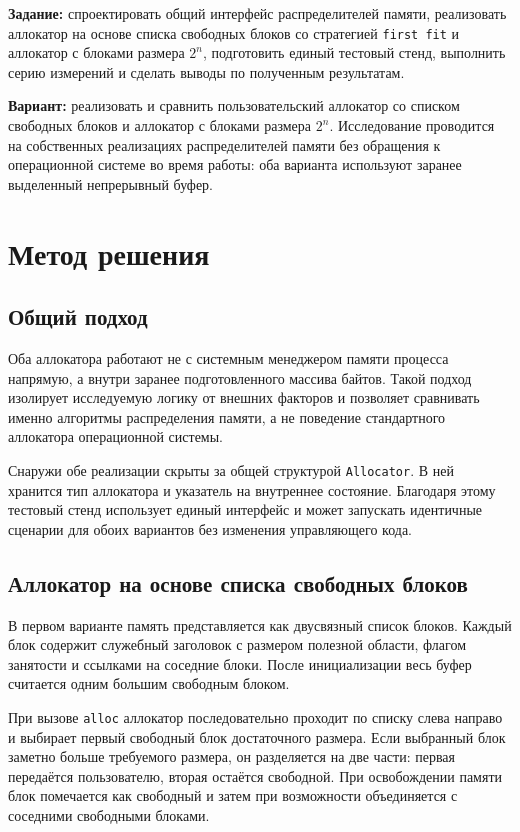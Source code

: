 \documentclass[unicode, 12pt, a4paper, oneside, fleqn]{article}
\begin{document}
\noindent\textbf{Задание:} спроектировать общий интерфейс распределителей памяти, реализовать аллокатор на основе списка свободных блоков со стратегией \texttt{first fit} и аллокатор с блоками размера $2^n$, подготовить единый тестовый стенд, выполнить серию измерений и сделать выводы по полученным результатам.

\noindent\textbf{Вариант:} реализовать и сравнить пользовательский аллокатор со списком свободных блоков и аллокатор с блоками размера $2^n$. Исследование проводится на собственных реализациях распределителей памяти без обращения к операционной системе во время работы: оба варианта используют заранее выделенный непрерывный буфер.

\section{Метод решения}

\subsection{Общий подход}

Оба аллокатора работают не с системным менеджером памяти процесса напрямую, а внутри заранее подготовленного массива байтов. Такой подход изолирует исследуемую логику от внешних факторов и позволяет сравнивать именно алгоритмы распределения памяти, а не поведение стандартного аллокатора операционной системы.

Снаружи обе реализации скрыты за общей структурой \texttt{Allocator}. В ней хранится тип аллокатора и указатель на внутреннее состояние. Благодаря этому тестовый стенд использует единый интерфейс и может запускать идентичные сценарии для обоих вариантов без изменения управляющего кода.

\subsection{Аллокатор на основе списка свободных блоков}

В первом варианте память представляется как двусвязный список блоков. Каждый блок содержит служебный заголовок с размером полезной области, флагом занятости и ссылками на соседние блоки. После инициализации весь буфер считается одним большим свободным блоком.

При вызове \texttt{alloc} аллокатор последовательно проходит по списку слева направо и выбирает первый свободный блок достаточного размера. Если выбранный блок заметно больше требуемого размера, он разделяется на две части: первая передаётся пользователю, вторая остаётся свободной. При освобождении памяти блок помечается как свободный и затем при возможности объединяется с соседними свободными блоками.
\end{document}
